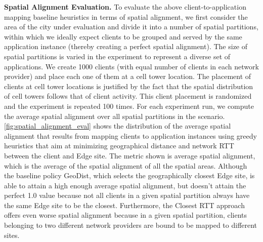 \par \noindent \textbf{Spatial Alignment Evaluation. }To evaluate the above client-to-application mapping baseline heuristics in terms of spatial alignment, we first consider the area of the city under evaluation and divide it into a number of spatial partitions, within which we ideally expect clients to be grouped and served by the same application instance (thereby creating a perfect spatial alignment). The size of spatial partitions is varied in the experiment to represent a diverse set of applications. We create 1000 clients (with equal number of clients in each network provider) and place each one of them at a cell tower location. The placement of clients at cell tower locations is justified by the fact that the spatial distribution of cell towers follows that of client activity. This client placement is randomized and the experiment is repeated 100 times. For each experiment run, we compute the average spatial alignment over all spatial partitions in the scenario. \cref{fig:spatial_alignment_eval} shows the distribution of the average spatial alignment that results from mapping clients to application instances using greedy heuristics that aim at minimizing geographical distance and network RTT between the client and Edge site. The metric shown is average spatial alignment, which is the average of the spatial alignment of all the spatial areas. Although the baseline policy GeoDist, which selects the geographically closest Edge site, is able to attain a high enough average spatial alignment, but doesn't attain the perfect 1.0 value because not all clients in a given spatial partition always have the same Edge site to be the closest. Furthermore, the Closest RTT approach offers even worse spatial alignment because in a given spatial partition, clients belonging to two different network providers are bound to be mapped to different sites. 

